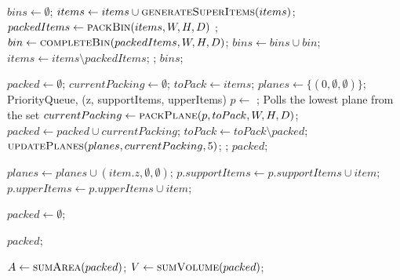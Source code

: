 \documentclass{article}
\begin{document}
\begin{algorithmic}
        \State $bins \gets \emptyset$;
        \State $items \gets items \cup \Call{generateSuperItems}{items}$;
        \Repeat
            \State $packedItems \gets \Call{packBin}{items, W, H, D}$ ;
            \State $bin \gets \Call{completeBin}{packedItems, W, H, D}$;
            \State $bins \gets bins \cup bin$; 
            \State $items \gets items \setminus packedItems$;
        ;
        \State \Return $bins$;
    \EndFunction
    \vspace{1cm}

        \State $packed \gets \emptyset$;
        \State $currentPacking \gets \emptyset$;
        \State $toPack \gets items$;
        \State $planes \gets \{ (0, \emptyset, \emptyset) \}$; \Comment PriorityQueue, (z, supportItems, upperItems)
        \Repeat
            \State $p \gets $ ; \Comment Polls the lowest plane from the set
            \State $currentPacking \gets \Call{packPlane}{p, toPack, W, H, D}$;
            \State $packed \gets packed \cup currentPacking$;
            \State $toPack \gets toPack \setminus packed$;
            \State $\Call{updatePlanes}{planes, currentPacking, 5}$;
        ;
        \State \Return $packed$;
    \EndFunction
    \vspace{1cm}

                \State $planes \gets planes \cup (item.z, \emptyset, \emptyset)$;
            \EndIf
                \State $p.supportItems \gets p.supportItems \cup item$;
            \EndFor
                \State $p.upperItems \gets p.upperItems \cup item$;
            \EndFor
        \EndFor
    \EndProcedure
    \newpage

        \State $packed \gets \emptyset$;

        \State \Return $packed$;
    \EndFunction

        \State $A \gets \Call{sumArea}{packed}$;
        \State $V \gets \Call{sumVolume}{packed}$;
    \EndFunction
\end{algorithmic}
\end{document}
